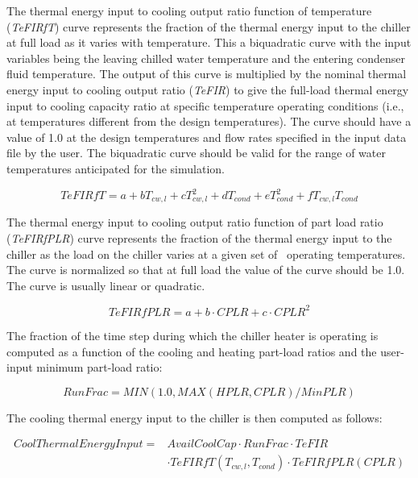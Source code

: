 The thermal energy input to cooling output ratio function of temperature (\emph{TeFIRfT}) curve represents the fraction of the thermal energy input to the chiller at full load as it varies with temperature. This a biquadratic curve with the input variables being the leaving chilled water temperature and the entering condenser fluid temperature. The output of this curve is multiplied by the nominal thermal energy input to cooling output ratio (\emph{TeFIR}) to give the full-load thermal energy input to cooling capacity ratio at specific temperature operating conditions (i.e., at temperatures different from the design temperatures). The curve should have a value of 1.0 at the design temperatures and flow rates specified in the input data file by the user. The biquadratic curve should be valid for the range of water temperatures anticipated for the simulation.

\begin{equation}
TeFIRfT = a + b{T_{cw,l}} + cT_{cw,l}^2 + d{T_{cond}} + eT_{cond}^2 + f{T_{cw,l}}{T_{cond}}
\end{equation}

The thermal energy input to cooling output ratio function of part load ratio (\emph{TeFIRfPLR}) curve represents the fraction of the thermal energy input to the chiller as the load on the chiller varies at a given set of~ operating temperatures. The curve is normalized so that at full load the value of the curve should be 1.0. The curve is usually linear or quadratic.

\begin{equation}
TeFIRfPLR = a + b \cdot CPLR + c \cdot CPL{R^2}
\end{equation}

The fraction of the time step during which the chiller heater is operating is computed as a function of the cooling and heating part-load ratios and the user-input minimum part-load ratio:

\begin{equation}
RunFrac = MIN(1.0,MAX\left( {HPLR,CPLR} \right)/MinPLR)
\end{equation}

The cooling thermal energy input to the chiller is then computed as follows:

\begin{equation}
\begin{split}
CoolThermalEnergyInput =& AvailCoolCap \cdot RunFrac \cdot TeFIR \\
& \cdot TeFIRfT\left( {{T_{cw,l}},{T_{cond}}} \right) \cdot TeFIRfPLR(CPLR)
\end{split}
\end{equation}

